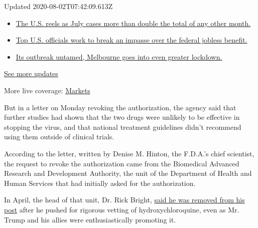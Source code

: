 Updated 2020-08-02T07:42:09.613Z

\begin{itemize}
\tightlist
\item
  \href{https://www.nytimes.com/2020/08/01/world/coronavirus-covid-19.html?action=click\&pgtype=Article\&state=default\&region=MAIN_CONTENT_1\&context=storylines_live_updates\#link-34047410}{The
  U.S. reels as July cases more than double the total of any other
  month.}
\item
  \href{https://www.nytimes.com/2020/08/01/world/coronavirus-covid-19.html?action=click\&pgtype=Article\&state=default\&region=MAIN_CONTENT_1\&context=storylines_live_updates\#link-780ec966}{Top
  U.S. officials work to break an impasse over the federal jobless
  benefit.}
\item
  \href{https://www.nytimes.com/2020/08/01/world/coronavirus-covid-19.html?action=click\&pgtype=Article\&state=default\&region=MAIN_CONTENT_1\&context=storylines_live_updates\#link-2bc8948}{Its
  outbreak untamed, Melbourne goes into even greater lockdown.}
\end{itemize}

\href{https://www.nytimes.com/2020/08/01/world/coronavirus-covid-19.html?action=click\&pgtype=Article\&state=default\&region=MAIN_CONTENT_1\&context=storylines_live_updates}{See
more updates}

More live coverage:
\href{https://www.nytimes.com/live/2020/07/31/business/stock-market-today-coronavirus?action=click\&pgtype=Article\&state=default\&region=MAIN_CONTENT_1\&context=storylines_live_updates}{Markets}

But in a letter on Monday revoking the authorization, the agency said
that further studies had shown that the two drugs were unlikely to be
effective in stopping the virus, and that national treatment guidelines
didn't recommend using them outside of clinical trials.

According to the letter, written by Denise M. Hinton, the F.D.A.'s chief
scientist, the request to revoke the authorization came from the
Biomedical Advanced Research and Development Authority, the unit of the
Department of Health and Human Services that had initially asked for the
authorization.

In April, the head of that unit, Dr. Rick Bright,
\href{https://www.nytimes.com/2020/04/22/us/politics/rick-bright-trump-hydroxychloroquine-coronavirus.html}{said
he was removed from his post} after he pushed for rigorous vetting of
hydroxychloroquine, even as Mr. Trump and his allies were
enthusiastically promoting it.


